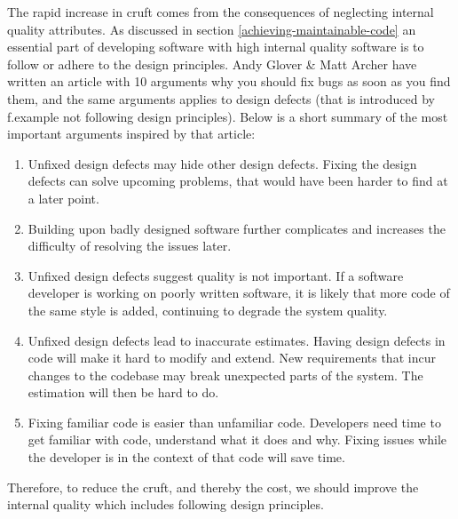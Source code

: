 \documentclass{report}
\begin{document}
The rapid increase in cruft comes from the consequences of neglecting internal quality attributes. As discussed in section \ref{achieving-maintainable-code} an essential part of developing software with high internal quality software is to follow or adhere to the design principles. Andy Glover \& Matt Archer have written an article with 10 arguments why you should fix bugs as soon as you find them\cite{10reasons}, and the same arguments applies to design defects (that is introduced by f.example not following design principles). Below is a short summary of the most important arguments inspired by that article:

\begin{enumerate}
    \item Unfixed design defects may hide other design defects. Fixing the design defects can solve upcoming problems, that would have been harder to find at a later point.
    \item Building upon badly designed software further complicates and increases the difficulty of resolving the issues later.
  
    \item Unfixed design defects suggest quality is not important. If a software developer is working on poorly written software, it is likely that more code of the same style is added, continuing to degrade the system quality.
   
    \item Unfixed design defects lead to inaccurate estimates. Having design defects in code will make it hard to modify and extend. New requirements that incur changes to the codebase may break unexpected parts of the system. The estimation will then be hard to do.
   
    \item Fixing familiar code is easier than unfamiliar code. Developers need time to get familiar with code, understand what it does and why. Fixing issues while the developer is in the context of that code will save time.
\end{enumerate}

Therefore, to reduce the cruft, and thereby the cost, we should improve the internal quality which includes following design principles.


\end{document}
